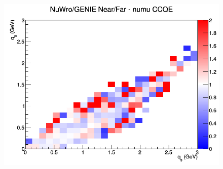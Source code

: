 \documentclass[12pt]{article}
\begin{document}
\begin{figure}[h]
\endminipage
{}
\includegraphics[width=\linewidth]{eff_q0_q3/GAr/ratios/CCQE_NuWro_GENIE_numu_NF_q3_q0.png}
\endminipage
\newline
\end{figure}
\clearpage
\end{document}
